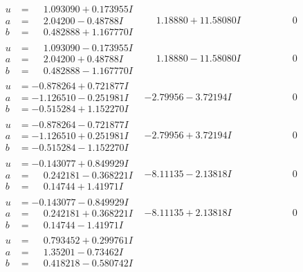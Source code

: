 \documentclass[1p]{elsarticle_modified}
\theoremstyle{definition}
\begin{document}
$$\begin{array}{c|c|c}
\begin{aligned}
u &= \phantom{-}1.093090 + 0.173955 I \\
a &= \phantom{-}2.04200 - 0.48788 I \\
b &= \phantom{-}0.482888 + 1.167770 I\end{aligned}
 & \phantom{-}1.18880 + 11.58080 I & \phantom{-0.000000 } 0 \\ \hline\begin{aligned}
u &= \phantom{-}1.093090 - 0.173955 I \\
a &= \phantom{-}2.04200 + 0.48788 I \\
b &= \phantom{-}0.482888 - 1.167770 I\end{aligned}
 & \phantom{-}1.18880 - 11.58080 I & \phantom{-0.000000 } 0 \\ \hline\begin{aligned}
u &= -0.878264 + 0.721877 I \\
a &= -1.126510 - 0.251981 I \\
b &= -0.515284 + 1.152270 I\end{aligned}
 & -2.79956 - 3.72194 I & \phantom{-0.000000 } 0 \\ \hline\begin{aligned}
u &= -0.878264 - 0.721877 I \\
a &= -1.126510 + 0.251981 I \\
b &= -0.515284 - 1.152270 I\end{aligned}
 & -2.79956 + 3.72194 I & \phantom{-0.000000 } 0 \\ \hline\begin{aligned}
u &= -0.143077 + 0.849929 I \\
a &= \phantom{-}0.242181 - 0.368221 I \\
b &= \phantom{-}0.14744 + 1.41971 I\end{aligned}
 & -8.11135 - 2.13818 I & \phantom{-0.000000 } 0 \\ \hline\begin{aligned}
u &= -0.143077 - 0.849929 I \\
a &= \phantom{-}0.242181 + 0.368221 I \\
b &= \phantom{-}0.14744 - 1.41971 I\end{aligned}
 & -8.11135 + 2.13818 I & \phantom{-0.000000 } 0 \\ \hline\begin{aligned}
u &= \phantom{-}0.793452 + 0.299761 I \\
a &= \phantom{-}1.35201 - 0.73462 I \\
b &= \phantom{-}0.418218 - 0.580742 I\end{aligned}

\end{array}$$
\end{document}
